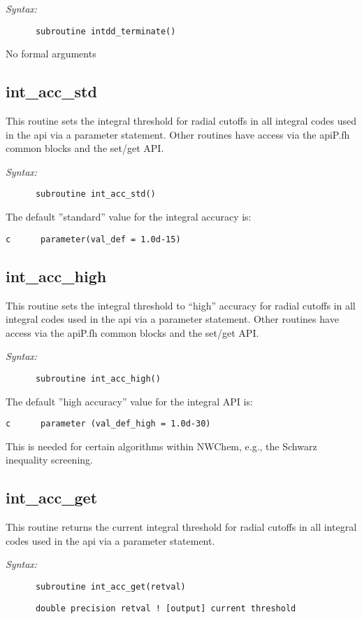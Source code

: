 {\it Syntax:} 
\begin{verbatim} 
      subroutine intdd_terminate() 
\end{verbatim} 
No formal arguments 
 
\subsection{int\_acc\_std} 
This routine sets the integral threshold for radial cutoffs in all  
integral codes used in the api via a parameter statement.  Other 
routines have access via the apiP.fh common blocks and the set/get API. 
 
{\it Syntax:} 
\begin{verbatim} 
      subroutine int_acc_std() 
\end{verbatim} 
The default ''standard'' value for the integral accuracy is: 
\begin{verbatim} 
c      parameter(val_def = 1.0d-15) 
\end{verbatim} 
\subsection{int\_acc\_high} 
This routine sets the integral threshold to ``high'' accuracy  
for radial cutoffs in all integral codes used in the api via a  
parameter statement.  Other routines have access via the apiP.fh  
common blocks and the set/get API. 
 
{\it Syntax:} 
\begin{verbatim} 
      subroutine int_acc_high() 
\end{verbatim} 
The default ''high accuracy'' value for the integral API is: 
\begin{verbatim} 
c      parameter (val_def_high = 1.0d-30) 
\end{verbatim} 
This is needed for certain algorithms within NWChem, e.g.,  
the Schwarz inequality screening. 
 
\subsection{int\_acc\_get} 
This routine returns the current integral threshold  
for radial cutoffs in all integral codes used in the api via a  
parameter statement.   
 
{\it Syntax:} 
\begin{verbatim} 
      subroutine int_acc_get(retval) 
\end{verbatim} 
\begin{verbatim} 
      double precision retval ! [output] current threshold 
\end{verbatim} 
